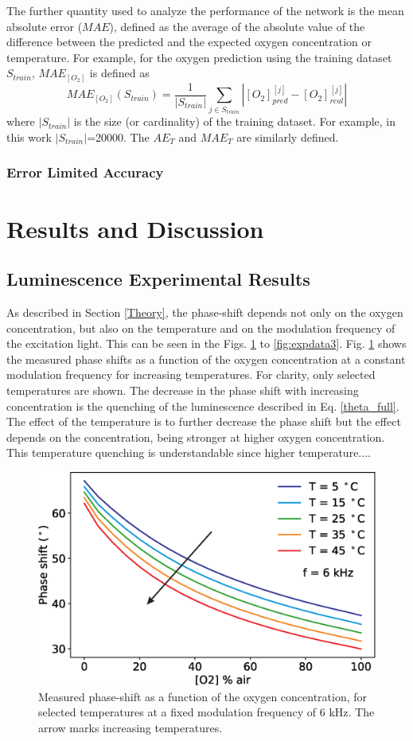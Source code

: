 \documentclass[9pt,twocolumn,twoside,pdftex]{optica}
\begin{document}
The further quantity used to analyze the performance of the network is the mean absolute error ($MAE$), defined as the average of the absolute value of the difference between the predicted and the expected oxygen concentration or temperature. For example, for the oxygen prediction using the training dataset $S_{train}$, $MAE_{[O_2]}$ is defined as 
\begin{equation}
\label{MAE}
MAE_{[O_2]}(S_{train}) = \frac{1}{|S_{train}|} \sum_{j \in S_{train}}|[O_2]_{pred}^{[j]}-[O_2]_{real}^{[j]}|
\end{equation}
where $|S_{train}|$ is the size (or cardinality) of the training dataset. For example, in this work $|S_{train}|$=20000.
The $AE_{T}$ and $MAE_T$ are similarly defined.

\subsubsection{Error Limited Accuracy}

\section{Results and Discussion}
\label{Results}

\subsection{Luminescence Experimental Results}

As described in Section \ref{Theory}, the phase-shift depends not only on the oxygen concentration, but also on the temperature and on the modulation frequency of the excitation light. This can be seen in the Figs. \ref{fig:expdata1} to \ref{fig:expdata3}.
Fig. \ref{fig:expdata1} shows the measured phase shifts as a function of the oxygen concentration at a constant modulation frequency for increasing temperatures. For clarity, only selected temperatures are shown. The decrease in the phase shift with increasing concentration is the quenching of the luminescence described in Eq. \ref{theta_full}. The effect of the temperature is to further decrease the phase shift but the effect depends on the concentration, being stronger at higher oxygen concentration. This temperature quenching is understandable since higher temperature.... 

\begin{figure}[htbp]
\centering
\includegraphics[width=8 cm]{phase_O2_T.eps}
\caption{Measured phase-shift as a function of the oxygen concentration, for selected temperatures at a fixed modulation frequency of 6 kHz. The arrow marks increasing temperatures.}
\label{fig:expdata1}
\end{figure}
\end{document}
